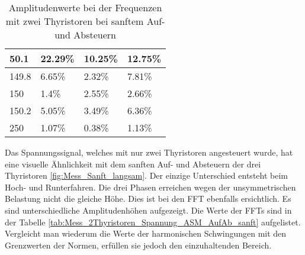 \begin{table}[ht!]
\begin{tabular}{|l|l|l|l|}
		50.1              & 22.29\%                                                                             & 10.25\%                                                                             & 12.75\%                                                                             \\ \hline
		149.8             & 6.65\%                                                                              & 2.32\%                                                                              & 7.81\%                                                                              \\ \hline
		150               & 1.4\%                                                                               & 2.55\%                                                                              & 2.66\%                                                                              \\ \hline
		150.2             & 5.05\%                                                                              & 3.49\%                                                                              & 6.36\%                                                                              \\ \hline
		250             & 1.07\%                                                                              & 0.38\%                                                                              & 1.13\%                                                                              \\ \hline
		
	\end{tabular}
\caption{Amplitudenwerte bei der Frequenzen mit zwei Thyristoren bei sanftem Auf- und Absteuern}\label{tab:Mess_2Thyristoren_Spannung_Widerstand_AufAb_sanft}
\end{table}

Das Spannungssignal, welches mit nur zwei Thyristoren angesteuert wurde, hat eine visuelle Ähnlichkeit mit dem sanften Auf- und Absteuern der drei Thyristoren \ref{fig:Mess_Sanft_langsam}. Der einzige Unterschied entsteht beim Hoch- und Runterfahren. Die drei Phasen erreichen wegen der unsymmetrischen Belastung nicht die gleiche Höhe. Dies ist bei den FFT ebenfalls ersichtlich. Es sind unterschiedliche Amplitudenhöhen aufgezeigt. Die Werte der FFTs sind in der Tabelle \ref{tab:Mess_2Thyristoren_Spannung_ASM_AufAb_sanft} aufgelistet. Vergleicht man wiederum die Werte der harmonischen Schwingungen mit den Grenzwerten der Normen, erfüllen sie jedoch den einzuhaltenden Bereich.


